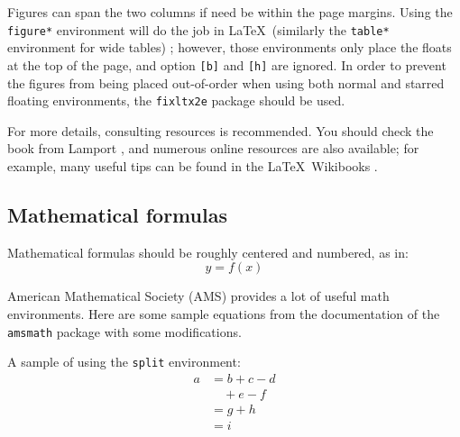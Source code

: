 \documentclass[conference]{worldcomp}
\begin{document}

Figures can span the two columns if need be within the page margins.
Using the \texttt{figure*} environment will do the job in \LaTeX\ (similarly the \texttt{table*} environment for wide tables) ; however, those environments only place the floats at the top of the page, and option \texttt{[b]} and \texttt{[h]} are ignored.
In order to prevent the figures from being placed out-of-order when using both normal and starred floating environments, 
the \texttt{fixltx2e} package should be used.


For more details, consulting resources is recommended.  You should check the book from Lamport \cite{Lamport}, and numerous online resources are also available; for example, many useful tips can be found in the \LaTeX\ Wikibooks \cite{LaTeXWikibook}.

\subsection{Mathematical formulas}\label{sec:math}
Mathematical formulas should be roughly centered and numbered, as in: 
\begin{equation}
  y = f(x)
\end{equation}

American Mathematical Society (AMS) provides a lot of useful math environments. Here are some sample equations from  the documentation of the \texttt{amsmath} package \cite{amsmathdoc} with some modifications.

A sample of using the \texttt{split} environment:
\begin{equation}\label{eqn:split}
\begin{split}
a& =b+c-d\\
 & \quad +e-f\\
 & =g+h\\
 & =i
\end{split}
\end{equation}
\end{document}

